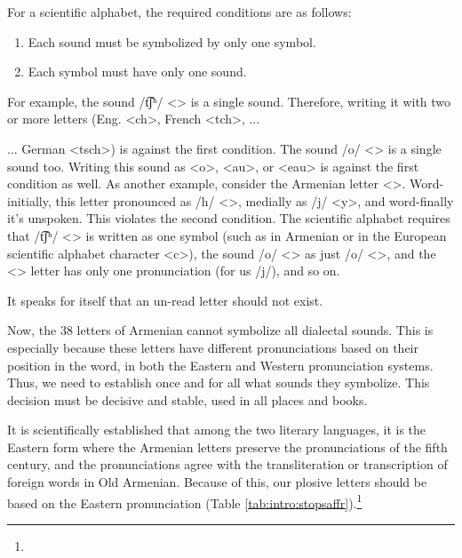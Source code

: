 For a scientific alphabet, the required conditions are as follows:
\begin{enumerate}
	\item Each sound must be symbolized by only one symbol. 
	\item Each symbol must have only one sound. 
\end{enumerate}


For example, the sound /t͡ʃʰ/ <> is a single sound. Therefore, writing it with two or more letters (Eng. <ch>, French <tch>, ... 


\begin{adjarianpage}\label{page:7}\end{adjarianpage}%


... German <tsch>) is against the first condition. The sound /o/ <> is a single sound too. Writing this sound as <o>, <au>, or <eau> is against the first condition as well. As another example, consider the Armenian letter <>. Word-initially, this letter pronounced as /h/ <>, medially as /j/ <y>, and word-finally it's unspoken. This violates the second condition. The scientific alphabet requires that /t͡ʃʰ/ <> is written as one symbol (such as in Armenian or in the European scientific alphabet character <c>), the sound /o/ <> as just /o/ <>, and the <> letter has only one pronunciation (for us /j/), and so on. 

It speaks for itself that an un-read letter should not exist. 

Now, the 38 letters of Armenian cannot symbolize all dialectal sounds. This is especially because these letters have different pronunciations based on their position in the word, in both the Eastern and Western pronunciation systems. Thus, we need to establish once and for all what sounds they symbolize. This decision must be decisive and stable, used in all places and books. 

It is scientifically established that among the two literary languages, it is the Eastern form where the Armenian letters preserve the pronunciations of the fifth century, and the pronunciations agree with the transliteration or transcription of foreign words in Old Armenian. Because of this, our plosive letters should be based on the Eastern pronunciation (Table \ref{tab:intro:stopsaffr}).\footnote{} 

